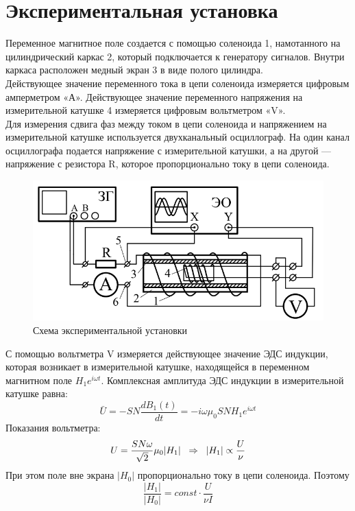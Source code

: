\section*{Экспериментальная установка}
\indent Переменное магнитное поле создается с помощью соленоида 1, намотанного на цилиндрический каркас 2, который подключается к генератору сигналов. Внутри каркаса расположен медный экран 3 в виде полого
цилиндра.
\\\indent Действующее значение переменного тока в цепи соленоида измеряется цифровым амперметром «А». Действующее значение переменного напряжения на измерительной катушке 4 измеряется цифровым вольтметром «V».
\\\indent Для измерения сдвига фаз между током в цепи соленоида и напряжением на измерительной катушке используется двухканальный осциллограф. На один канал осциллографа подается напряжение с измерительной катушки, а на другой —
напряжение с резистора R, которое пропорционально току в цепи соленоида.
\begin{figure}[h!]
    \centering
    \includegraphics[width=12cm]{images/setup.png}
    \caption{Схема экспериментальной установки}
\end{figure}
\indent С помощью вольтметра V измеряется действующее значение ЭДС индукции, которая возникает в измерительной катушке, находящейся в переменном магнитном поле $H_1e^{i\omega t}$. Комплексная амплитуда ЭДС индукции в измерительной катушке равна:
\begin{equation}
    \bar{U} = -SN\frac{dB_1(t)}{dt} = -i\omega\mu_0 S N H_1e^{i\omega t}
\end{equation}
Показания вольтметра:
\begin{equation}
    U = \frac{S N\omega}{\sqrt{2}}\mu_0|H_1|\hspace{0.2cm} \Rightarrow \hspace{0.2cm}|H_1| \propto \frac{U}{\nu}
\end{equation}
При этом поле вне экрана $|H_0|$ пропорционально току в цепи соленоида. Поэтому
\begin{equation}
    \frac{|H_1|}{|H_0|} = const\cdot\frac{U}{\nu I}
\end{equation}
